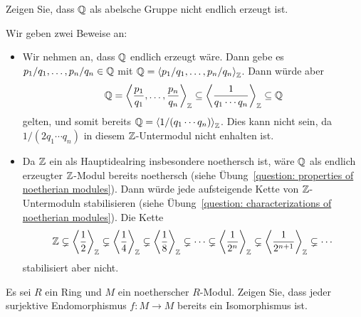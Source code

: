\begin{question}[subtitle = $\Rational$ ist nicht endlich erzeugt]
  \label{question: Q is not finitely generated}
  Zeigen Sie, dass $\Rational$ als abelsche Gruppe nicht endlich erzeugt ist.
\end{question}


\begin{solution}
  Wir geben zwei Beweise an:
  \begin{itemize}
    \item
      Wir nehmen an, dass $\Rational$ endlich erzeugt wäre.
      Dann gebe es $p_1/q_1, \dotsc, p_n/q_n \in \mathbb{Q}$ mit $\mathbb{Q} = \left\langle p_1/q_1, \dotsc, p_n/q_n \right\rangle_{\mathbb{Z}}$.
      Dann würde aber
      \[
                  \mathbb{Q}
        =         \left\langle  \frac{p_1}{q_1}, \dotsc, \frac{p_n}{q_n}  \right\rangle_{\mathbb{Z}}
        \subseteq \left\langle \frac{1}{q_1 \dotsm q_n} \right\rangle_{\mathbb{Z}}
        \subseteq \mathbb{Q}
      \]
      gelten, und somit bereits $\mathbb{Q} = \left\langle 1/(q_1 \dotsm q_n) \right\rangle_{\mathbb{Z}}$.
      Dies kann nicht sein, da $1/(2 q_1 \dotsm q_n)$ in diesem $\mathbb{Z}$-Untermodul nicht enhalten ist.
      
    \item
      Da $\mathbb{Z}$ ein als Hauptidealring insbesondere noethersch ist, wäre $\Rational$ als endlich erzeugter $\mathbb{Z}$-Modul bereits noethersch (siehe Übung~\ref{question: properties of noetherian modules}).
      Dann würde jede aufsteigende Kette von $\mathbb{Z}$-Untermoduln stabilisieren (siehe Übung~\ref{question: characterizations of noetherian modules}).
      Die Kette
      \[
                    \mathbb{Z}
        \subsetneq  \left\langle \frac{1}{2} \right\rangle_{\mathbb{Z}}
        \subsetneq  \left\langle \frac{1}{4} \right\rangle_{\mathbb{Z}}
        \subsetneq  \left\langle \frac{1}{8} \right\rangle_{\mathbb{Z}}
        \subsetneq  \dotsb
        \subsetneq  \left\langle \frac{1}{2^n} \right\rangle_{\mathbb{Z}}
        \subsetneq  \left\langle \frac{1}{2^{n+1}} \right\rangle_{\mathbb{Z}}
        \subsetneq  \dotsb
      \]
      stabilisiert aber nicht.
  \end{itemize}
\end{solution}


\begin{question}[subtitle = Surjektive Endomorphismen noetherscher Moduln]
  \label{question: surjective endomorphisms of noetherian modules are isomorphisms}
  Es sei $R$ ein Ring und $M$ ein noetherscher $R$-Modul.
  Zeigen Sie, dass jeder surjektive Endomorphismus $f \colon M \to M$ bereits ein Isomorphismus ist.
\end{question}


